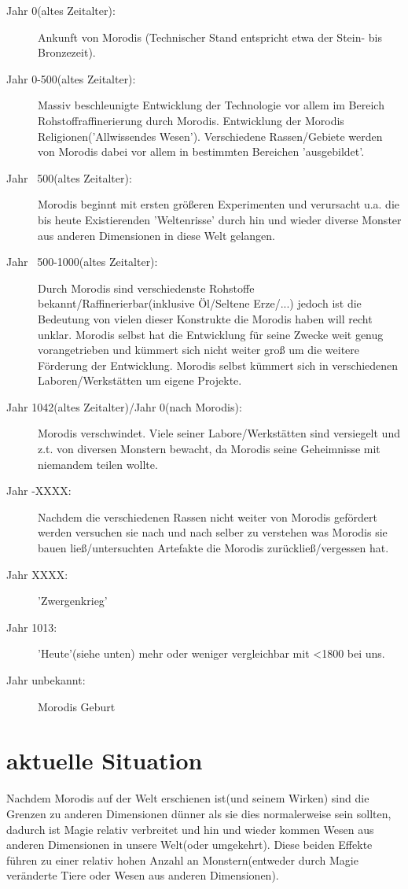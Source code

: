 \begin{description}
	\item[Jahr 0(altes Zeitalter):] Ankunft von Morodis (Technischer Stand entspricht etwa der Stein- bis Bronzezeit).
	\item[Jahr 0-500(altes Zeitalter):] Massiv beschleunigte Entwicklung der Technologie vor allem im Bereich Rohstoffraffinerierung durch Morodis. Entwicklung der Morodis Religionen('Allwissendes Wesen'). Verschiedene Rassen/Gebiete werden von Morodis dabei vor allem in bestimmten Bereichen 'ausgebildet'.
	\item[Jahr ~500(altes Zeitalter):] Morodis beginnt mit ersten größeren Experimenten und verursacht u.a. die bis heute Existierenden 'Weltenrisse' durch hin und wieder diverse Monster aus anderen Dimensionen in diese Welt gelangen.
	\item[Jahr ~500-1000(altes Zeitalter):] Durch Morodis sind verschiedenste Rohstoffe bekannt/Raffinerierbar(inklusive Öl/Seltene Erze/...) jedoch ist die Bedeutung von vielen dieser Konstrukte die Morodis haben will recht unklar. Morodis selbst hat die Entwicklung für seine Zwecke weit genug vorangetrieben und kümmert sich nicht weiter groß um die weitere Förderung der Entwicklung. Morodis selbst kümmert sich in verschiedenen Laboren/Werkstätten um eigene Projekte.
	\item[Jahr 1042(altes Zeitalter)/Jahr 0(nach Morodis):] Morodis verschwindet. Viele seiner Labore/Werkstätten sind versiegelt und z.t. von diversen Monstern bewacht, da Morodis seine Geheimnisse mit niemandem teilen wollte.
	\item[Jahr -XXXX:] Nachdem die verschiedenen Rassen nicht weiter von Morodis gefördert werden versuchen sie nach und nach selber zu verstehen was Morodis sie bauen ließ/untersuchten Artefakte die Morodis zurückließ/vergessen hat.
	\item[Jahr XXXX:] 'Zwergenkrieg'
	\item[Jahr 1013:] 'Heute'(siehe unten) mehr oder weniger vergleichbar mit <1800 bei uns.
	\item[Jahr unbekannt:] Morodis Geburt
\end{description}

\section{aktuelle Situation}
Nachdem Morodis auf der Welt erschienen ist(und seinem Wirken) sind die Grenzen zu anderen Dimensionen dünner als sie dies normalerweise sein sollten, dadurch ist Magie relativ verbreitet und hin und wieder kommen Wesen aus anderen Dimensionen in unsere Welt(oder umgekehrt).
Diese beiden Effekte führen zu einer relativ hohen Anzahl an Monstern(entweder durch Magie veränderte Tiere oder Wesen aus anderen Dimensionen).

